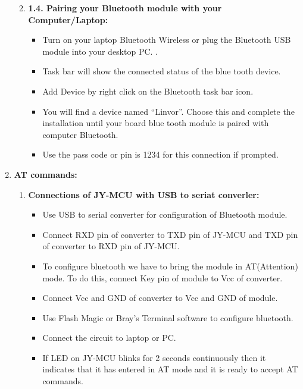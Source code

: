 \documentclass[12pt]{article}
\begin{document}
\begin{enumerate}
\begin{enumerate}
\begin{center}
{}

\end{center}
	\item \textbf{1.4.	Pairing your Bluetooth module with your Computer/Laptop: }


\begin{itemize}
	\item Turn on your laptop Bluetooth Wireless or plug the Bluetooth USB module into your desktop PC. .
	\item Task bar will show the connected status of the blue tooth device. 
	\item Add Device by right click on the Bluetooth task bar icon. 
	\item You will find a device named “Linvor”. Choose this and complete the installation until your board blue tooth module is paired with computer Bluetooth. 
	\item Use the pass code or pin is 1234 for this connection if prompted.
\end{itemize}
\end{enumerate}

	\item \textbf{{\large AT commands:}}

\begin{enumerate}
	\item \textbf{Connections of JY-MCU with USB to seriat converler:}
\begin{itemize}
	\item Use USB to serial converter for configuration of Bluetooth module.
	\item Connect RXD pin of converter to TXD pin of JY-MCU and TXD pin of converter to RXD pin of JY-MCU.
	\item To configure bluetooth we have to bring the module in AT(Attention) mode. To do this, connect Key pin of module to Vcc of converter.
	\item Connect Vcc and GND of converter to Vcc and GND of module.
	\item Use Flash Magic or Bray's Terminal software to configure bluetooth.
	\item Connect the circuit to laptop or PC.
	\item If LED on JY-MCU blinks for 2 seconds continuously then it indicates that it has entered in AT mode and it is ready to accept AT commands.
\end{itemize}


\end{enumerate}
\end{enumerate}
\end{document}
